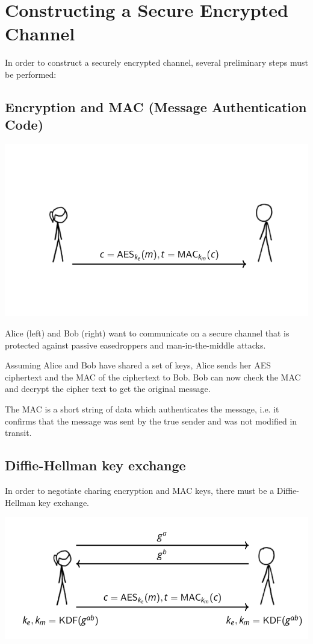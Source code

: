 \documentclass[11pt]{article} %
\begin{document}
\section{Constructing a Secure Encrypted Channel}
In order to construct a securely encrypted channel, several preliminary
steps must be performed:

\subsection{Encryption and MAC (Message Authentication Code)}

\begin{center}
	\includegraphics[scale=.7]{./tls1.png}
\end{center}

{\parindent0pt Alice (left) and Bob (right) want to communicate on a secure 
channel that is protected against passive easedroppers and man-in-the-middle
attacks.}

\bigskip
{\parindent0pt Assuming Alice and Bob have shared a set of keys, Alice sends her
AES ciphertext and the MAC of the ciphertext to Bob.  Bob can now check the MAC
and decrypt the cipher text to get the original message.}

\bigskip
{\parindent0pt The MAC is a short string of data which authenticates the message, i.e. it
confirms that the message was sent by the true sender and was not modified in transit.}

\newpage
\subsection{Diffie-Hellman key exchange}
In order to negotiate charing encryption and MAC keys, there must be a
Diffie-Hellman key exchange.

\begin{center}
	\includegraphics[scale=.7]{./tls2.png}
\end{center}
\end{document}
